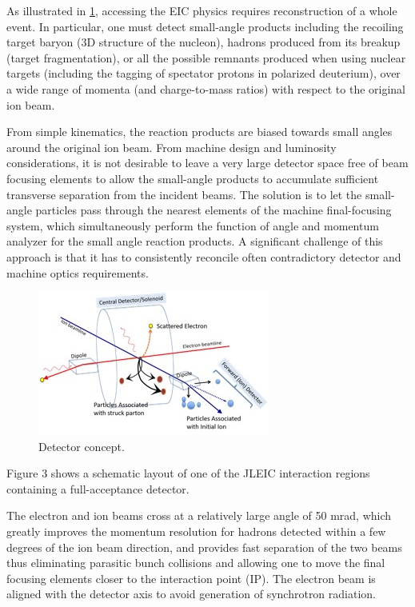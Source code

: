 As illustrated in \ref{fig:detector_concept}, accessing the EIC physics requires reconstruction of a whole event. In particular, one must detect small-angle products including the recoiling target baryon (3D structure of the nucleon), hadrons produced from its breakup (target fragmentation), or all the possible remnants produced when using nuclear targets (including the tagging of spectator protons in polarized deuterium), over a wide range of momenta (and charge-to-mass ratios) with respect to the original ion beam.

From simple kinematics, the reaction products are biased towards small angles around the original ion beam. From machine design and luminosity considerations, it is not desirable to leave a very large detector space free of beam focusing elements to allow the small-angle products to accumulate sufficient transverse separation from the incident beams. The solution is to let the small-angle particles pass through the nearest elements of the machine final-focusing system, which simultaneously perform the function of angle and momentum analyzer for the small angle reaction products. A significant challenge of this approach is that it has to consistently reconcile often contradictory detector and machine optics requirements.

\begin{figure}
	\centering
	\includegraphics[width=.75\textwidth]{../../img/central_detector.jpg}
	\caption{Detector concept.}
	\label{fig:detector_concept}
\end{figure}

Figure 3 shows a schematic layout of one of the JLEIC interaction regions containing a full-acceptance detector. %

The electron and ion beams cross at a relatively large angle of 50 mrad, which greatly improves the momentum resolution for hadrons detected within a few degrees of the ion beam direction, and provides fast separation of the two beams thus eliminating parasitic bunch collisions and allowing one to move the final focusing elements closer to the interaction point (IP). The electron beam is aligned with the detector axis to avoid generation of synchrotron radiation.



